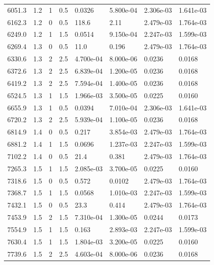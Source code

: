 \documentclass[preview]{standalone}
\begin{document}
{{{\begin{tabular}{L{1.2cm}C{1.2cm} C{0.3cm}C{0.5cm} C{1.4cm}C{1.4cm} C{1.4cm}C{1.4cm}}
  6051.3  &   1.2  & 1     & 0.5 &  0.0326  & 5.800e-04  & 2.306e-03 &  1.641e-03   \\ 
  6162.3  &   1.2  & 0     & 0.5 &  118.6  & 2.11  & 2.479e-03 &  1.764e-03   \\ 
  6249.0  &   1.2  & 1     & 1.5 &  0.0514  & 9.150e-04  & 2.247e-03 &  1.599e-03   \\ 
  6269.4  &   1.3  & 0     & 0.5 &  11.0  & 0.196  & 2.479e-03 &  1.764e-03   \\ 
  6330.6  &   1.3  & 2     & 2.5 &  4.700e-04  & 8.000e-06  & 0.0236 &  0.0168   \\ 
  6372.6  &   1.3  & 2     & 2.5 &  6.839e-04  & 1.200e-05  & 0.0236 &  0.0168   \\ 
  6419.2  &   1.3  & 2     & 2.5 &  7.594e-04  & 1.400e-05  & 0.0236 &  0.0168   \\ 
  6524.5  &   1.3  & 1     & 1.5 &  1.966e-03  & 3.500e-05  & 0.0225 &  0.0160   \\ 
  6655.9  &   1.3  & 1     & 0.5 &  0.0394  & 7.010e-04  & 2.306e-03 &  1.641e-03   \\ 
  6720.2  &   1.3  & 2     & 2.5 &  5.939e-04  & 1.100e-05  & 0.0236 &  0.0168   \\ 
  6814.9  &   1.4  & 0     & 0.5 &  0.217  & 3.854e-03  & 2.479e-03 &  1.764e-03   \\ 
  6881.2  &   1.4  & 1     & 1.5 &  0.0696  & 1.237e-03  & 2.247e-03 &  1.599e-03   \\ 
  7102.2  &   1.4  & 0     & 0.5 &  21.4  & 0.381  & 2.479e-03 &  1.764e-03   \\ 
  7265.3  &   1.5  & 1     & 1.5 &  2.085e-03  & 3.700e-05  & 0.0225 &  0.0160   \\ 
  7318.6  &   1.5  & 0     & 0.5 &  0.572  & 0.0102  & 2.479e-03 &  1.764e-03   \\ 
  7368.7  &   1.5  & 1     & 1.5 &  0.0568  & 1.010e-03  & 2.247e-03 &  1.599e-03   \\ 
  7432.1  &   1.5  & 0     & 0.5 &  23.3  & 0.414  & 2.479e-03 &  1.764e-03   \\ 
  7453.9  &   1.5  & 2     & 1.5 &  7.310e-04  & 1.300e-05  & 0.0244 &  0.0173   \\ 
  7554.9  &   1.5  & 1     & 1.5 &  0.163  & 2.893e-03  & 2.247e-03 &  1.599e-03   \\ 
  7630.4  &   1.5  & 1     & 1.5 &  1.804e-03  & 3.200e-05  & 0.0225 &  0.0160   \\ 
  7739.6  &   1.5  & 2     & 2.5 &  4.603e-04  & 8.000e-06  & 0.0236 &  0.0168   \\ 

\end{tabular}}}}
\end{document}

